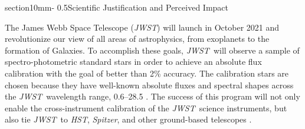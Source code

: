\documentclass[letterpaper,12pt]{article}
\makeatletter
\renewcommand{\section}{\@startsection%
{section}{1}{0mm}{-\baselineskip}%
{0.5\baselineskip}{\normalfont\Large\bfseries}}%
\newcommand{\jwst}{{\it JWST}}
\newcommand{\spitzer}{{\it Spitzer}}
\newcommand{\hst}{{\it HST}}
\newcommand{\swift}{{\it Swift}}
\newcommand{\fermi}{{\it Fermi}}
\newcommand{\mum}{\ifmmode{\rm \mu m}\else{$\mu$m}\fi}
\makeatother
\begin{document}




\section{Scientific Justification and Perceived Impact}

The James Webb Space Telescope (\jwst) will launch in October 2021 and revolutionize our view of all areas of astrophysics, from exoplanets to the formation of Galaxies. To accomplish these goals, \jwst\ will observe a sample of spectro-photometric standard stars in order to achieve an absolute flux calibration with the goal of better than 2\% accuracy.  The calibration stars are chosen because they have well-known absolute fluxes and spectral shapes across the \jwst\ wavelength range, 0.6--28.5 \mum.  The success of this program will not only enable the cross-instrument calibration of the \jwst\ science instruments, but also tie \jwst\ to \hst, \spitzer, and other ground-based telescopes \citep{Bohlin2014PASP}.
\end{document}
